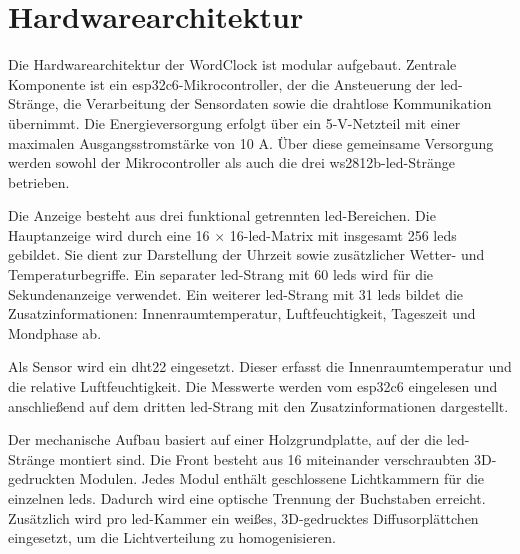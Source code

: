 \section{Hardwarearchitektur}
Die Hardwarearchitektur der WordClock ist modular aufgebaut.
Zentrale Komponente ist ein \gls{esp32c6}-Mikrocontroller, der die Ansteuerung der \gls{led}-Stränge, die Verarbeitung der Sensordaten sowie die drahtlose Kommunikation übernimmt.
Die Energieversorgung erfolgt über ein 5-V-Netzteil mit einer maximalen Ausgangsstromstärke von 10 A.
Über diese gemeinsame Versorgung werden sowohl der Mikrocontroller als auch die drei \gls{ws2812b}-\gls{led}-Stränge betrieben.

Die Anzeige besteht aus drei funktional getrennten \gls{led}-Bereichen.
Die Hauptanzeige wird durch eine 16 $\times$ 16-\gls{led}-Matrix mit insgesamt 256 \gls{led}s gebildet.
Sie dient zur Darstellung der Uhrzeit sowie zusätzlicher Wetter- und Temperaturbegriffe.
Ein separater \gls{led}-Strang mit 60 \gls{led}s wird für die Sekundenanzeige verwendet.
Ein weiterer \gls{led}-Strang mit 31 \gls{led}s bildet die Zusatzinformationen: Innenraumtemperatur, Luftfeuchtigkeit, Tageszeit und Mondphase ab.

Als Sensor wird ein \gls{dht22} eingesetzt.
Dieser erfasst die Innenraumtemperatur und die relative Luftfeuchtigkeit.
Die Messwerte werden vom \gls{esp32c6} eingelesen und anschließend auf dem dritten \gls{led}-Strang mit den Zusatzinformationen dargestellt.

Der mechanische Aufbau basiert auf einer Holzgrundplatte, auf der die \gls{led}-Stränge montiert sind.
Die Front besteht aus 16 miteinander verschraubten 3D-gedruckten Modulen.
Jedes Modul enthält geschlossene Lichtkammern für die einzelnen \gls{led}s.
Dadurch wird eine optische Trennung der Buchstaben erreicht.
Zusätzlich wird pro \gls{led}-Kammer ein weißes, 3D-gedrucktes Diffusorplättchen eingesetzt, um die Lichtverteilung zu homogenisieren.